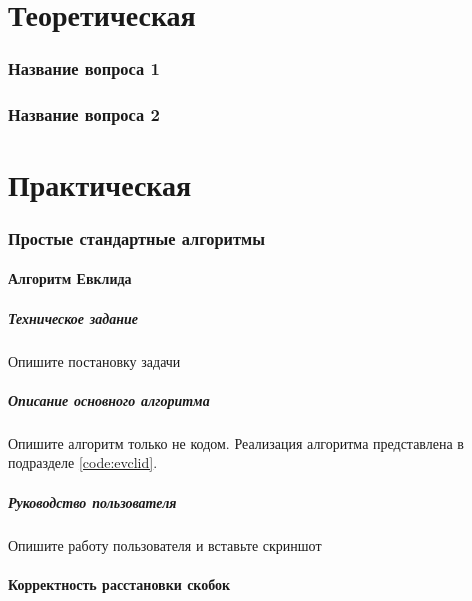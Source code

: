 \documentclass[a4paper,14pt]{extarticle}
\begin{document}

\newpage

\tableofcontents
\newpage
\
\part{Теоретическая}

\section{Название вопроса 1}

\section{Название вопроса 2}
\newpage

\part{Практическая}
\section{Простые стандартные алгоритмы}
\subsection{Алгоритм Евклида} 
\subsubsection{Техническое задание}
Опишите постановку задачи

\subsubsection{Описание основного алгоритма}
Опишите алгоритм только не кодом. Реализация алгоритма представлена в подразделе \ref{code:evclid}.

\subsubsection{Руководство пользователя}
Опишите работу пользователя и вставьте скриншот

\subsection{Корректность расстановки скобок}
\end{document}
